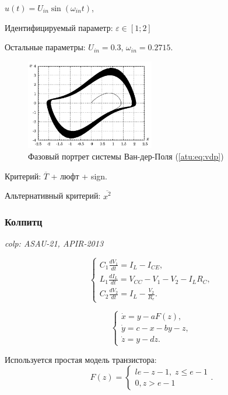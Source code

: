\documentclass[a4paper,12pt]{article}
\newcommand{\LinkRef}[1]{ \textit{#1} }
\begin{document}
\( u(t) = U_{in} \sin ( \omega_{in} t ) \),

Идентифицируемый параметр:
\( \varepsilon \in [1;2]  \)

Остальные параметры:
\(U_{in}=0.3\),
\(\omega_{in}=0.2715\).


\begin{figure}[htb!]
\centerline{\includegraphics[width=0.5\textwidth]{p/cha/vdp_phase.pdf} }
\caption{Фазовый портрет системы Ван-дер-Поля (\ref{atu:eq:vdp})}
\label{atu:f:vdp_phase}
\end{figure}

Критерий:
$\overline{T}$ + люфт + sign.

Альтернативный критерий:
$\overline{x^2}$


\FloatBarrier
\subsubsection{Колпитц} %

\LinkRef{
  colp: ASAU-21, APIR-2013
}

\begin{equation}
\label{atu:eq:colp_phys}
\begin{cases}
  C_1 \frac{dV_{1}}{dt}  = I_L - I_{CE} , \\
  L_1 \frac{dI_L}{dt}    = V_{CC} - V_{1} - V_{2} - I_L R_C , \\
  C_2 \frac{dV_{2}}{dt}  = I_L - \frac{V_{2}}{R_e}.
\end{cases}
\end{equation}

\begin{equation}
\label{atu:eq:colp}
\begin{cases}
  \dot{x} = y - a F(z), \\
  \dot{y} = c - x - by - z, \\
  \dot{z} = y - d z.
\end{cases}
\end{equation}

Используется простая модель транзистора:
\[
F(z) =
\begin{cases}{l}
    e-z-1, \; z \le e-1
    \\
    0, z>e-1
\end{cases}.
\]
\end{document}
